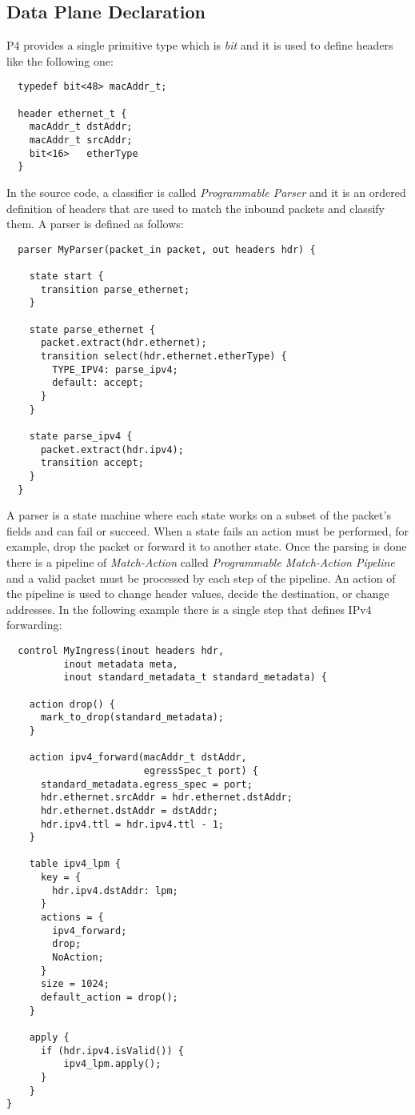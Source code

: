 \documentclass[../sn.tex]{subfiles}
\begin{document}
\subsection{Data Plane Declaration}
P4 provides a single primitive type which is \emph{bit} and it is used to define headers like the following one:
\begin{lstlisting}
  typedef bit<48> macAddr_t;

  header ethernet_t {
    macAddr_t dstAddr;
    macAddr_t srcAddr;
    bit<16>   etherType
  }
\end{lstlisting}
In the source code, a classifier is called \emph{Programmable Parser} and it is an ordered definition of headers that are used to match the inbound packets and classify them. A parser is defined as follows:
\begin{lstlisting}
  parser MyParser(packet_in packet, out headers hdr) {

    state start {
      transition parse_ethernet;
    }

    state parse_ethernet {
      packet.extract(hdr.ethernet);
      transition select(hdr.ethernet.etherType) {
        TYPE_IPV4: parse_ipv4;
        default: accept;
      }
    }

    state parse_ipv4 {
      packet.extract(hdr.ipv4);
      transition accept;
    }
  }
\end{lstlisting}
A parser is a state machine where each state works on a subset of the packet's fields and can fail or succeed. When a state fails an action must be performed, for example, drop the packet or forward it to another state.
Once the parsing is done there is a pipeline of \emph{Match-Action} called \emph{Programmable Match-Action Pipeline} and a valid packet must be processed by each step of the pipeline.
An action of the pipeline is used to change header values, decide the destination, or change addresses. In the following example there is a single step that defines IPv4 forwarding:
\begin{lstlisting}
  control MyIngress(inout headers hdr,
          inout metadata meta,
          inout standard_metadata_t standard_metadata) {

    action drop() {
      mark_to_drop(standard_metadata);
    }

    action ipv4_forward(macAddr_t dstAddr, 
                        egressSpec_t port) {
      standard_metadata.egress_spec = port;
      hdr.ethernet.srcAddr = hdr.ethernet.dstAddr;
      hdr.ethernet.dstAddr = dstAddr;
      hdr.ipv4.ttl = hdr.ipv4.ttl - 1;
    }

    table ipv4_lpm {
      key = {
        hdr.ipv4.dstAddr: lpm;
      }
      actions = {
        ipv4_forward;
        drop;
        NoAction;
      }
      size = 1024;
      default_action = drop();
    }

    apply {
      if (hdr.ipv4.isValid()) {
          ipv4_lpm.apply();
      }
    }
}
\end{lstlisting}
\end{document}
